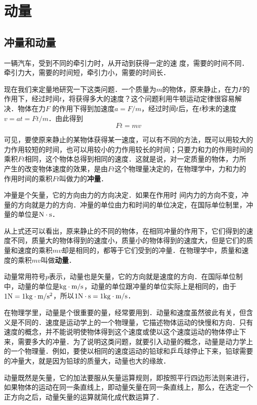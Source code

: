 

\chapter{动量}
\section{冲量和动量}

一辆汽车，受到不同的牵引力时，从开动到获得一定的速
度，需要的时间不同．牵引力大，需要的时间短，牵引力小，需要的时间长．

现在我们来定量地研究一下这类问题．一个质量为$m$的物体，原来静止，在力$F$的作用下，经过时间$t$，将获得多大的速度？这个问题利用牛顿运动定律很容易解决．物体在力$F$
的作用下得到加速度$a=F/m$，经过时间$t$后，在$t$秒末的速度
$v=at=Ft/m$．由此得到
\[Ft=mv\]

可见，要使原来静止的某物体获得某一速度，可以有不同的方法，既可以用较大的力作用较短的时间，也可以用较小的力作用较长的时间；只要力和力的作用时间的乘积$Ft$相同，这个物体总得到相同的速度．这就是说，对一定质量的物体，力所产生的改变物体速度的效果，是由$Ft$这个物理量决定的，在物理学中，力和力的作用时间的乘积$Ft$叫做力的\textbf{冲量}．

冲量是个矢量，它的方向由力的方向决定．如果在作用时
间内力的方向不变，冲量的方向就是力的方向．冲量的单位由力和时间的单位决定，在国际单位制里，冲量的单位是${\rm N}\cdot {\rm s}$．

从上式还可以看出，原来静止的不同的物体，在相同冲量的作用下，它们得到的速度不同，质量大的物体得到的速度小，质量小的物体得到的速度大，但是它们的质量和速度的乘积$mv$却是相同的，都等于它们受到的冲量．在物理学中，质量和速度的乘积$mv$叫做\textbf{动量}．

动量常用符号$p$表示，动量也是矢量，它的方向就是速度的方向．在国际单位制中，动量的单位是${\rm kg}\cdot \text{m}/\text{s}$，动量的单位跟冲量的单位实际上是相同的，由于$1{\rm N}=1{\rm kg}\cdot \text{m}/\text{s}^2$，所以$1{\rm N}\cdot {\rm s}=1{\rm kg}\cdot \text{m}/\text{s}$．

在物理学里，动量是个很重要的量，经常要用到．动量和速度虽然彼此有关，但含义是不同的．速度是运动学上的一个物理量，它描述物体运动的快慢和方向．只有速度的概念，并不能说明使物体得到这个速度或使以这个速度运动的物体停止下来，需要多大的冲量．为了说明这类问题，就要引入动量的概念，动量是动力学上的一个物理量．例如，要使以相同的速度运动的铅球和乒乓球停止下来，铅球需要的冲量大，就是因为铅球的质量大，动量也大的缘故．

动量既然是矢量，它的加法要服从矢量运算规则，即按照平行四边形法则来进行，如果物体的运动在同一条直线上，即动量矢量在同一条直线上，那么，在选定一个正方向之后，动量矢量的运算就简化成代数运算了．


